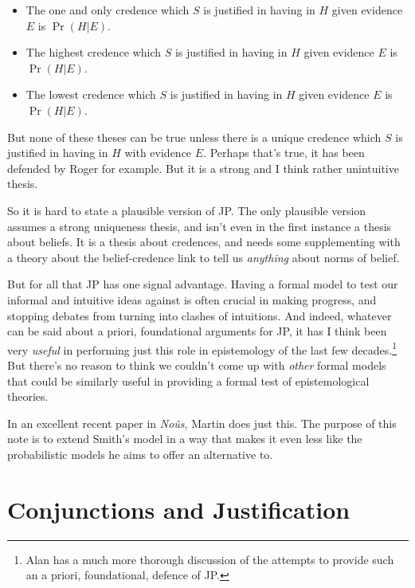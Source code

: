 \begin{itemize}
\item The one and only credence which $S$ is justified in having in $H$ given evidence $E$ is $\Pr(H | E)$.

\item The highest credence which $S$ is justified in having in $H$ given evidence $E$ is $\Pr(H | E)$.

\item The lowest credence which $S$ is justified in having in $H$ given evidence $E$ is $\Pr(H | E)$.

\end{itemize}

\noindent But none of these theses can be true unless there is a unique credence which $S$ is justified in having in $H$ with evidence $E$. Perhaps that's true, it has been defended by Roger \citet{White2005-WHIEP} for example. But it is a strong and I think rather unintuitive thesis.

So it is hard to state a plausible version of JP. The only plausible version assumes a strong uniqueness thesis, and isn't even in the first instance a thesis about beliefs. It is a thesis about credences, and needs some supplementing with a theory about the belief-credence link to tell us \emph{anything} about norms of belief.

But for all that JP has one signal advantage. Having a formal model to test our informal and intuitive ideas against is often crucial in making progress, and stopping debates from turning into clashes of intuitions. And indeed, whatever can be said about a priori, foundational arguments for JP, it has I think been very \emph{useful} in performing just this role in epistemology of the last few decades.\footnote{Alan \citet{Hajek2008} has a much more thorough discussion of the attempts to provide such an a priori, foundational, defence of JP.} But there's no reason to think we couldn't come up with \emph{other} formal models that could be similarly useful in providing a formal test of epistemological theories.

In an excellent recent paper in \emph{No\^{u}s}, Martin \citet{MartinSmith2010} does just this. The purpose of this note is to extend Smith's model in a way that makes it even less like the probabilistic models he aims to offer an alternative to.

\section{Conjunctions and Justification}
\label{conjunctionsandjustification}

